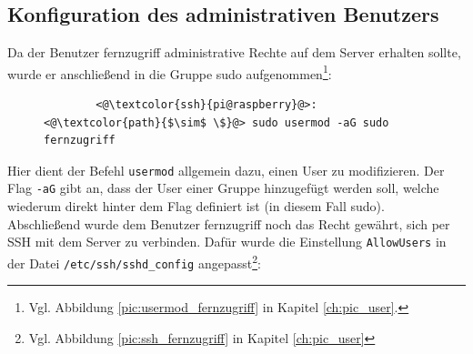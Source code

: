 \documentclass[a4paper, 11pt]{scrartcl}
\begin{document}
\subsection{Konfiguration des administrativen Benutzers}\label{ch:user_admincfg}
Da der Benutzer \glqq fernzugriff\grqq{} administrative Rechte auf dem Server erhalten sollte, wurde er anschließend in die Gruppe \glqq sudo\grqq{} aufgenommen\footnote{Vgl. Abbildung \ref{pic:usermod_fernzugriff} in Kapitel \ref{ch:pic_user}.}:
\begin{figure}[H]
    \begin{mdframed}[backgroundcolor=bbg]
        \begin{lstlisting}
        <@\textcolor{ssh}{pi@raspberry}@>:<@\textcolor{path}{$\sim$ \$}@> sudo usermod -aG sudo fernzugriff
        \end{lstlisting}
    \end{mdframed}
    \label{lst:usermod_fernzugriff}
\end{figure}
Hier dient der Befehl \lstinline[basicstyle={\small\ttfamily\color{black}}]|usermod| allgemein dazu, einen User zu modifizieren. Der Flag \lstinline[basicstyle={\small\ttfamily\color{black}}]|-aG| gibt an,
dass der User einer Gruppe hinzugefügt werden soll, welche wiederum direkt hinter dem Flag definiert ist (in diesem Fall \glqq sudo\grqq).
\\
Abschließend wurde dem Benutzer \glqq fernzugriff\grqq{} noch das Recht gewährt, sich per SSH mit dem Server zu verbinden. Dafür wurde die Einstellung \lstinline[basicstyle={\small\ttfamily\color{black}}]|AllowUsers|
in der Datei \lstinline[basicstyle={\small\ttfamily\color{black}}]|/etc/ssh/sshd_config| angepasst\footnote{Vgl. Abbildung \ref{pic:ssh_fernzugriff} in Kapitel \ref{ch:pic_user}}:
\end{document}
